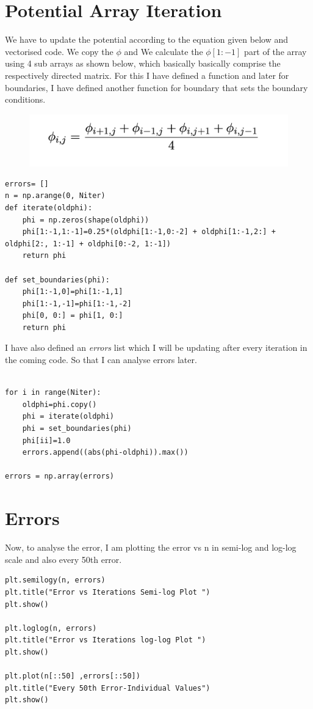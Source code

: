 \documentclass[12pt, a4paper]{report}
\begin{document}
 \section*{Potential Array Iteration}
 We have to update the potential according to the equation given below and vectorised code. We copy the $\phi$ and We calculate the $\phi[1:-1]$ part of the array using 4 sub arrays as shown below, which basically basically comprise the respectively directed matrix. For this I have defined a function and later for boundaries, I have defined another function for boundary that sets the boundary conditions.
 
  \begin{figure}[!tbh]
   	\centering
   	\includegraphics[scale=0.85]{F.png}
 \end{figure} 

\begin{Verbatim}
errors= []
n = np.arange(0, Niter)
def iterate(oldphi):
    phi = np.zeros(shape(oldphi))
    phi[1:-1,1:-1]=0.25*(oldphi[1:-1,0:-2] + oldphi[1:-1,2:] + oldphi[2:, 1:-1] + oldphi[0:-2, 1:-1])
    return phi

def set_boundaries(phi):
    phi[1:-1,0]=phi[1:-1,1]
    phi[1:-1,-1]=phi[1:-1,-2]
    phi[0, 0:] = phi[1, 0:]
    return phi
\end{Verbatim}
  
I have also defined an \textit{errors} list which I will be updating after every iteration in the coming code. So that I can analyse errors later.
\begin{Verbatim}

for i in range(Niter):
    oldphi=phi.copy()
    phi = iterate(oldphi)
    phi = set_boundaries(phi)
    phi[ii]=1.0
    errors.append((abs(phi-oldphi)).max())

errors = np.array(errors)
\end{Verbatim}

\section*{Errors}

Now, to analyse the error, I am plotting the error vs n in semi-log and log-log scale and also every 50th error.
\begin{Verbatim}
plt.semilogy(n, errors)
plt.title("Error vs Iterations Semi-log Plot ")
plt.show()

plt.loglog(n, errors)
plt.title("Error vs Iterations log-log Plot ")
plt.show()

plt.plot(n[::50] ,errors[::50])
plt.title("Every 50th Error-Individual Values")
plt.show()
\end{Verbatim}
\end{document}
